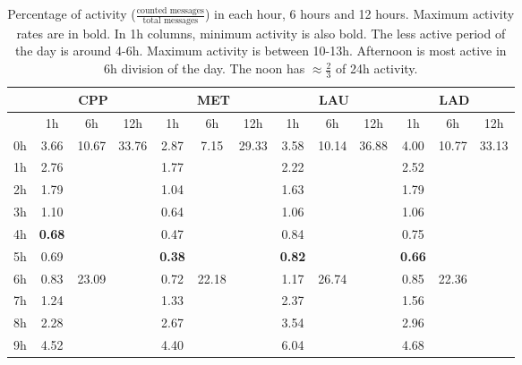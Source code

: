 \documentclass[%
 aip,
 jmp,%
 amsmath,amssymb,
 reprint,%
]{revtex4-1}
\begin{document}
\begin{table}
    \caption{Percentage of activity ($\frac{\text{counted messages}}{\text{total messages}}$) in each hour, 6 hours and 12 hours. Maximum activity rates are in bold. In 1h columns, minimum activity is also bold. The less active period of the day is around 4-6h. Maximum activity is between 10-13h. Afternoon is most active in 6h division of the day. The noon has $\approx \frac{2}{3}$ of 24h activity. }\label{dia}
\begin{center}
    \begin{tabular}{ |l|| c|c|c| c|c|c| c|c|c| c|c|c|}
        \hline
    & \multicolumn{3}{c|}{CPP} & \multicolumn{3}{c|}{MET} & \multicolumn{3}{c|}{LAU} & \multicolumn{3}{c|}{LAD}  \\ \hline
    & 1h   & 6h & 12h &   1h & 6h & 12h &   1h & 6h & 12h &   1h & 6h & 12h \\ \hline\hline
0h  & 3.66 & \multirow{6}{*}{10.67} & \multirow{12}{*}{33.76} & 2.87  & \multirow{6}{*}{7.15} & \multirow{12}{*}{29.33} & 3.58 & \multirow{6}{*}{10.14} &  \multirow{12}{*}{36.88} & 4.00 & \multirow{6}{*}{10.77} & \multirow{12}{*}{33.13} \\
1h  & 2.76 &                        &                         & 1.77  & & &  2.22 & & & 2.52 & & \\
2h  & 1.79 &                        &                         & 1.04  & & & 1.63 & & & 1.79 & & \\
3h  & 1.10 &                        &                         & 0.64  & & & 1.06 & & & 1.06 & & \\
4h  & {\bf 0.68} &                        &                         & 0.47  & & &  0.84 & & & 0.75 & & \\
5h  & 0.69 &                        &                         & {\bf 0.38}  & & & {\bf 0.82} & & & {\bf 0.66} & & \\\cline{3-3}\cline{6-6}\cline{9-9}\cline{12-12}
6h  & 0.83 & \multirow{6}{*}{23.09} &                         & 0.72  & \multirow{6}{*}{22.18} & & 1.17 & \multirow{6}{*}{26.74} & & 0.85 & \multirow{6}{*}{22.36} &  \\
7h  & 1.24 &                        &                         & 1.33  & & & 2.37 & & & 1.56 & & \\
8h  & 2.28 &                        &                         & 2.67  & & & 3.54 & & & 2.96 & & \\
9h  & 4.52 &                        &                         & 4.40  & & & 6.04 & & & 4.68 & & \\

\end{tabular}
\end{center}
\end{table}
\end{document}

